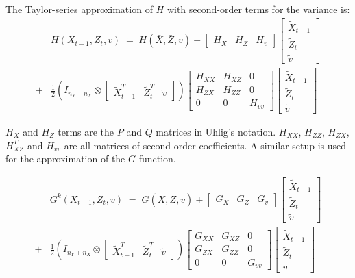 \documentclass[letterpaper,12pt]{article}
\theoremstyle{definition}
\begin{document}
\begin{spacing}{1.5}
		The Taylor-series approximation of $H$ with second-order terms for the variance is:
		\begin{equation} \label{Perturb_quadtermsH}
		\begin{split}
		& H(X_{t-1},Z_t,v) \;\dot =\; H(\bar X,\bar Z,\bar v) + \begin{bmatrix} H_X & H_Z & H_v \end{bmatrix}\begin{bmatrix} \tilde X_{t-1} \\ \tilde Z_t  \\ \tilde v \end{bmatrix} \\
		+ & \frac{1}{2} \left( I_{n_Y+n_X} \otimes \begin{bmatrix}\tilde X_{t-1}^T & \tilde Z_t^T & \tilde v \end{bmatrix} \right) \begin{bmatrix} H_{XX} & H_{XZ} & 0 \\  H_{ZX} & H_{ZZ} & 0 \\ 0 & 0 & H_{vv} \end{bmatrix} \begin{bmatrix} \tilde X_{t-1} \\ \tilde Z_t \\ \tilde v \end{bmatrix}
		\end{split}
		\end{equation}
		
		$H_X$ and $H_Z$ terms are the $P$ and $Q$ matrices in Uhlig's notation.  $H_{XX}$, $H_{ZZ}$, $H_{ZX}$, $H_{XZ}^T$ and $H_{vv}$ are all \citet{MagnusNeudecker:1999} matrices of second-order coefficients.  A similar setup is used for the approximation of the $G$ function.

		\begin{equation} \label{Perturb_quadtermsG}
		\begin{split}
		& G^k(X_{t-1},Z_t,v) \;\dot =\; G(\bar X,\bar Z,\bar v) + \begin{bmatrix} G_X & G_Z & G_v \end{bmatrix}\begin{bmatrix} \tilde X_{t-1} \\ \tilde Z_t  \\ \tilde v \end{bmatrix} \\
		+ & \frac{1}{2} \left( I_{n_Y+n_X} \otimes \begin{bmatrix}\tilde X_{t-1}^T & \tilde Z_t^T & \tilde v \end{bmatrix} \right) \begin{bmatrix} G_{XX} & G_{XZ} & 0 \\  G_{ZX} & G_{ZZ} & 0 \\ 0 & 0 & G_{vv} \end{bmatrix} \begin{bmatrix} \tilde X_{t-1} \\ \tilde Z_t \\ \tilde v \end{bmatrix}
		\end{split}
		\end{equation}


\end{spacing}
\end{document}

